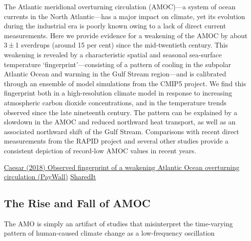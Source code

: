 \documentclass[
]{book}
\begin{document}
The Atlantic meridional overturning circulation (AMOC)---a system of ocean currents in the North Atlantic---has a major impact on climate, yet its evolution during the industrial era is poorly known owing to a lack of direct current measurements. Here we provide evidence for a weakening of the AMOC by about 3 ± 1 sverdrups (around 15 per cent) since the mid-twentieth century. This weakening is revealed by a characteristic spatial and seasonal sea-surface temperature `fingerprint'---consisting of a pattern of cooling in the subpolar Atlantic Ocean and warming in the Gulf Stream region---and is calibrated through an ensemble of model simulations from the CMIP5 project. We find this fingerprint both in a high-resolution climate model in response to increasing atmospheric carbon dioxide concentrations, and in the temperature trends observed since the late nineteenth century. The pattern can be explained by a slowdown in the AMOC and reduced northward heat transport, as well as an associated northward shift of the Gulf Stream. Comparisons with recent direct measurements from the RAPID project and several other studies provide a consistent depiction of record-low AMOC values in recent years.

\href{https://www.nature.com/articles/s41586-018-0006-5}{Caesar (2018) Observed fingerprint of a weakening Atlantic Ocean overturning circulation (PayWall)}
\href{https://www.nature.com/articles/s41586-018-0006-5.epdf?author_access_token=d9GwXXnkYQw6itiGny0ZW9RgN0jAjWel9jnR3ZoTv0OdzeJ18XkImxSDnyYEEsE8cCDHkcmVSlMgRd2VzekBpzVfe728uOBU7B1e8unrLGpKyeWhlTvQKe6JHGdYV8iLm4nND7KgW4aTVEUH8xo0AA\%3D\%3D}{SharedIt}

\hypertarget{the-rise-and-fall-of-amoc}{%
\subsection{The Rise and Fall of AMOC}\label{the-rise-and-fall-of-amoc}}

The AMO is simply an artifact of studies that misinterpret
the time-varying pattern of human-caused climate change
as a low-frequency oscillation
\end{document}
